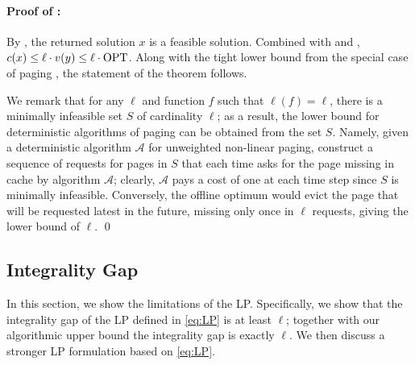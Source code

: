 \documentclass[11pt]{article}
\newcommand{\cA}{{\mathcal{A}}}
\newcommand{\OPT}{\textnormal{OPT}}
\begin{document}
\paragraph{Proof of :}
By , the returned solution $x$ is a feasible solution. Combined with  and , %
$c(x) \leq \ell \cdot v(y) \leq \ell \cdot \OPT$.
Along with the tight lower bound from the special case of paging \cite{sleator1985amortized}, the statement of the theorem follows. 

We remark that for any $\ell$ and function $f$ such that $\ell(f) = \ell$, there is a minimally infeasible set $S$ of cardinality $\ell$; as a result, the lower bound for deterministic algorithms of paging \cite{sleator1985amortized} can be obtained from the set $S$. Namely, given a deterministic algorithm $\cA$ for unweighted non-linear paging, construct a sequence of requests for pages in $S$ that each time asks for the page missing in cache by algorithm $\cA$; clearly, $\cA$ pays a cost of one at each time step since $S$ is minimally infeasible. Conversely, the offline optimum would evict the page that will be requested latest in the future, missing only once in $\ell$ requests, giving the lower bound of $\ell$. 
\qed




\subsection{Integrality Gap}
\label{sec:integralityGap}
In this section, we show the limitations of the LP. Specifically, we show that the integrality gap of the LP defined in \eqref{eq:LP} is at least $\ell$; together with our algorithmic upper bound the integrality gap is exactly $\ell$. We then discuss a stronger LP formulation based on \eqref{eq:LP}. 
\end{document}
